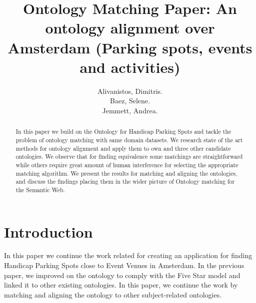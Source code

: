 \documentclass[runningheads,a4paper]{../../StyleFiles/llncs}
\begin{document}
\mainmatter  %

\title{Ontology Matching Paper: An ontology alignment over Amsterdam (Parking spots, events and activities)}


%
%
\author{Alivanistos, Dimitris. \\ Baez, Selene. \\ Jemmett, Andrea.}
%


\maketitle


\begin{abstract}
	In this paper we build on the Ontology for Handicap Parking Spots and tackle the problem of ontology matching with same domain datasets. We research state of the art methods for ontology alignment and apply them to own and three other candidate ontologies.
	We observe that for finding equivalence some matchings are straightforward while others require great amount of human interference for selecting the appropriate matching algorithm. 
	We present the results for matching and aligning the ontologies, and discuss the findings placing them in the wider picture of Ontology matching for the Semantic Web.
\end{abstract}


\section{Introduction}
In this paper we continue the work related for creating an application for finding Handicap Parking Spots close to Event Venues in Amsterdam. In the previous paper, we improved on the ontology to comply with the Five Star model and linked it to other existing ontologies. In this paper, we continue the work by matching and aligning the ontology to other subject-related ontologies. 
\end{document}
